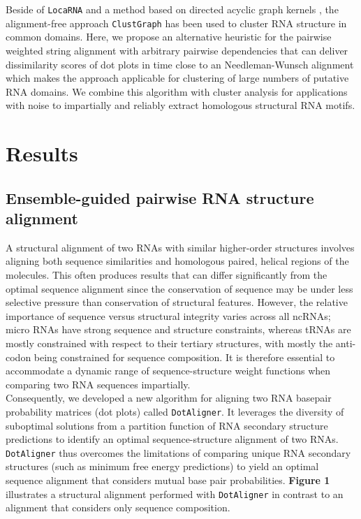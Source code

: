 \documentclass[a4paper,11pt]{article}
\newcommand\dotaligner{\texttt{DotAligner}}
\newcommand\clustgraph{\texttt{ClustGraph}}
\newcommand\locarna{\texttt{LocaRNA}}
\begin{document}
Beside of \locarna{} and a method based on directed acyclic graph kernels
\cite{Sato18647390}, the alignment-free approach \clustgraph{}
\cite{Heyne22689765} has been used to cluster RNA structure in common domains.
Here, we propose an alternative heuristic for the pairwise weighted string
alignment with arbitrary pairwise dependencies that can deliver dissimilarity
scores of dot plots in time close to an Needleman-Wunsch alignment which makes
the approach applicable for clustering of large numbers of putative RNA domains.
We combine this algorithm with cluster analysis for applications with 
noise to impartially and reliably extract homologous structural RNA motifs. \\ 

\section{ Results }
\subsection*{ Ensemble-guided pairwise RNA structure alignment} 

A structural alignment of two RNAs with similar higher-order structures 
involves aligning both sequence similarities and homologous paired,
helical regions of the molecules. This often produces results that 
can differ significantly from the optimal sequence alignment since 
the conservation of sequence may be under less selective pressure than 
conservation of structural features. However, the relative importance 
of sequence  versus structural integrity varies across all ncRNAs; micro 
RNAs have strong sequence and structure constraints, whereas tRNAs
are mostly constrained with respect to their tertiary structures, with mostly
the anti-codon being constrained for sequence composition. It is 
therefore essential to accommodate a dynamic range of sequence-structure 
weight functions when comparing two RNA sequences impartially. \\
 
Consequently, we developed a new algorithm for aligning two RNA 
basepair probability matrices (dot plots) called \dotaligner{}. It leverages the diversity of 
suboptimal solutions from a partition function of RNA secondary structure 
predictions to identify an optimal sequence-structure alignment of two RNAs. 
\dotaligner{} thus overcomes the limitations of comparing unique RNA 
secondary structures (such as minimum free energy predictions) to yield 
an optimal sequence alignment that considers mutual base pair probabilities.
\textbf{Figure 1} illustrates a structural alignment performed with \dotaligner{}
in contrast to an alignment that considers only sequence composition.\\
\end{document}
